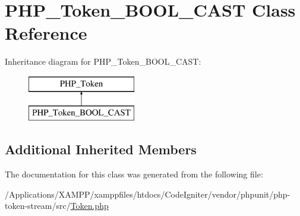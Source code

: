 \hypertarget{class_p_h_p___token___b_o_o_l___c_a_s_t}{}\section{P\+H\+P\+\_\+\+Token\+\_\+\+B\+O\+O\+L\+\_\+\+C\+A\+ST Class Reference}
\label{class_p_h_p___token___b_o_o_l___c_a_s_t}
Inheritance diagram for P\+H\+P\+\_\+\+Token\+\_\+\+B\+O\+O\+L\+\_\+\+C\+A\+ST\+:\begin{figure}[H]
\begin{center}
\leavevmode
\includegraphics[height=2.000000cm]{class_p_h_p___token___b_o_o_l___c_a_s_t}
\end{center}
\end{figure}
\subsection*{Additional Inherited Members}


The documentation for this class was generated from the following file\+:\begin{DoxyCompactItemize}
\item 
/\+Applications/\+X\+A\+M\+P\+P/xamppfiles/htdocs/\+Code\+Igniter/vendor/phpunit/php-\/token-\/stream/src/\mbox{\hyperlink{_token_8php}{Token.\+php}}\end{DoxyCompactItemize}
